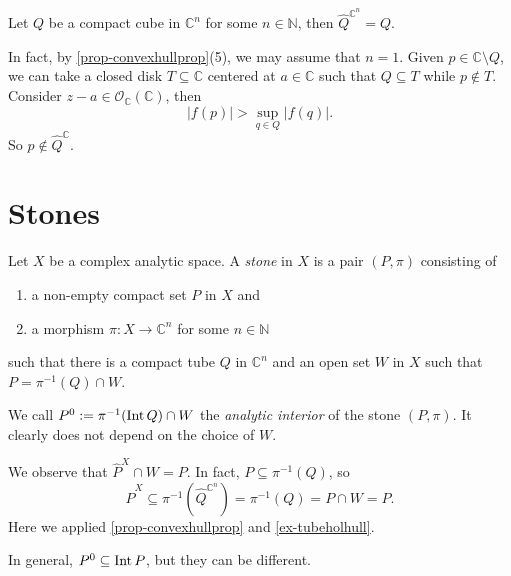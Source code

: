 \begin{example}\label{ex-tubeholhull}
    Let $Q$ be a compact cube in $\mathbb{C}^n$ for some $n\in \mathbb{N}$, then $\hat{Q}^{\mathbb{C}^n}=Q$.

    In fact, by \cref{prop-convexhullprop}(5), we may assume that $n=1$. Given $p\in \mathbb{C}\setminus Q$, we can take a closed disk $T\subseteq \mathbb{C}$ centered at $a\in \mathbb{C}$ such that $Q\subseteq T$ while $p\not\in T$. Consider $z-a\in \mathcal{O}_{\mathbb{C}}(\mathbb{C})$, then
    \[
        |f(p)|>\sup_{q\in Q}|f(q)|.  
    \]
    So $p\not\in \hat{Q}^{\mathbb{C}}$.
\end{example}

\section{Stones}

\begin{definition}\label{def-stone}
    Let $X$ be a complex analytic space. A \emph{stone} in $X$ is a pair $(P,\pi)$ consisting of 
    \begin{enumerate}
        \item a non-empty compact set $P$ in $X$ and
        \item a morphism $\pi:X\rightarrow \mathbb{C}^n$ for some $n \in \mathbb{N}$
    \end{enumerate}
    such that there is a compact tube $Q$ in $\mathbb{C}^n$ and an open set $W$ in $X$ such that $P=\pi^{-1}(Q)\cap W$.

    We call $P^0:=\pi^{-1}(\operatorname{Int} Q)\cap W$ the \emph{analytic interior} of the stone $(P,\pi)$. It clearly does not depend on the choice of $W$.
\end{definition}
We observe that $\hat{P}^X\cap W=P$. In fact, $P\subseteq \pi^{-1}(Q)$, so
\[
    \hat{P}^X\subseteq \pi^{-1}(\hat{Q}^{\mathbb{C}^n})=\pi^{-1}(Q)=P\cap W=P.  
\]
Here we applied \cref{prop-convexhullprop} and \cref{ex-tubeholhull}.

In general, $P^0\subseteq \operatorname{Int} P$, but they can be different.

